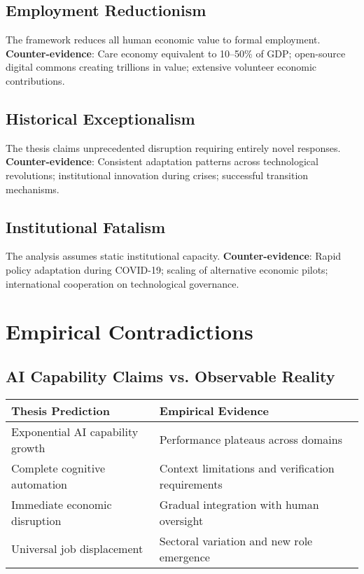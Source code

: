 \documentclass[11pt,a4paper]{article}
\newcommand{\emphasis}[1]{\textbf{\textcolor{primaryblue}{#1}}}
\begin{document}
\subsection{Employment Reductionism}

The framework reduces all human economic value to formal employment. \emphasis{Counter-evidence}: Care economy equivalent to 10--50\% of GDP; open-source digital commons creating trillions in value; extensive volunteer economic contributions.

\subsection{Historical Exceptionalism}

The thesis claims unprecedented disruption requiring entirely novel responses. \emphasis{Counter-evidence}: Consistent adaptation patterns across technological revolutions; institutional innovation during crises; successful transition mechanisms.

\subsection{Institutional Fatalism}

The analysis assumes static institutional capacity. \emphasis{Counter-evidence}: Rapid policy adaptation during COVID-19; scaling of alternative economic pilots; international cooperation on technological governance.

\section{Empirical Contradictions}

\subsection{AI Capability Claims vs. Observable Reality}

\begin{tabular}{p{} p{}}
\toprule
\textbf{Thesis Prediction} & \textbf{Empirical Evidence} \\
\midrule
Exponential AI capability growth & Performance plateaus across domains \\
Complete cognitive automation & Context limitations and verification requirements \\
Immediate economic disruption & Gradual integration with human oversight \\
Universal job displacement & Sectoral variation and new role emergence \\
\bottomrule
\end{tabular}
\end{document}
